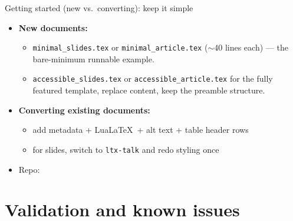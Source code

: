 \begin{frame}{Getting started (new vs.\ converting): keep it simple}
\begin{itemize}
\item \textbf{New documents:}
  \begin{itemize}
  \item {} \texttt{minimal\_slides.tex} or \texttt{minimal\_article.tex} ($\sim$40 lines each) --- the bare-minimum runnable example.
  \item {} \texttt{accessible\_slides.tex} or \texttt{accessible\_article.tex} for the fully featured template, replace content, keep the preamble structure.
  \end{itemize}

\bigskip

\item \textbf{Converting existing documents:}
  \begin{itemize}
  \item add metadata + Lua\LaTeX\ + alt text + table header rows
  \item for slides, switch to \texttt{ltx-talk} and redo styling once
  \end{itemize}

\bigskip

\item Repo: 
\end{itemize}
\end{frame}

\section{Validation and known issues}

